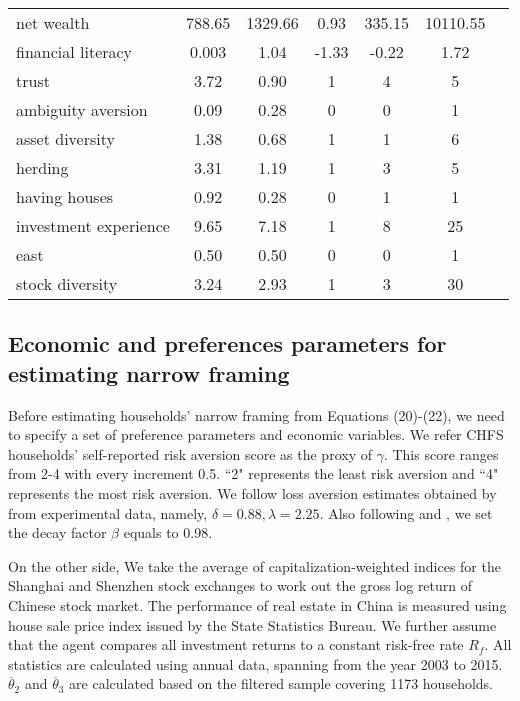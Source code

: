 \documentclass[ukenglish,nottitlepage,thmsb,11pt,letterpaper]{article}
\begin{document}
\begin{spacing}{1}
\begin{table}[H]
\begin{tabular*}{\textwidth}{l @{\extracolsep{\fill}} cccccc}
 			net wealth        &788.65 &1329.66 &0.93  &335.15 &10110.55 \\
 			financial literacy      &0.003 &1.04 &-1.33 &-0.22 &1.72  \\
 			trust                   &3.72 &0.90 &1       &4      &5        \\
 			ambiguity aversion      &0.09 &0.28 &0       &0      &1       \\
 			asset diversity         &1.38 &0.68 &1       &1      &6       \\
 			herding                 &3.31 &1.19 &1       &3      &5      \\
 			having houses           &0.92 &0.28 &0       &1      &1      \\
 			investment experience   &9.65   &7.18   &1   &8   &25        \\
 			east                    &0.50   &0.50   &0   &0  &1           \\
 			stock diversity         &3.24   &2.93   &1   &3  &30   \\
 			\bottomrule
 		\end{tabular*}%
 	\end{table}%
 \end{spacing}
\subsection{Economic and preferences parameters for estimating narrow framing}

Before estimating households' narrow framing from Equations (20)-(22), we need to specify a set of preference parameters and economic variables. We refer CHFS households' self-reported risk aversion score as the proxy of $\gamma$. This score ranges from 2-4 with every increment 0.5. ``2" represents the least risk aversion and ``4" represents the most risk aversion. We follow loss aversion estimates obtained by \citet{Tversky1992} from experimental data, namely, $\delta = 0.88, \lambda = 2.25$. Also following \citet{Barberis2009} and \citet{Giorgi2012}, we set the decay factor $\beta$ equals to 0.98. 

On the other side, We take the average of capitalization-weighted indices for the Shanghai and Shenzhen stock exchanges to work out the gross log return of Chinese stock market. The performance of real estate in China is measured using house sale price index issued by the State Statistics Bureau. We further assume that the agent compares all investment returns to a constant risk-free rate $R_f$. All statistics are calculated using annual data, spanning from the year 2003 to 2015. $\overline{\theta}_2$ and $\overline{\theta}_3$ are calculated based on the filtered sample covering 1173 households. 
\end{document}
